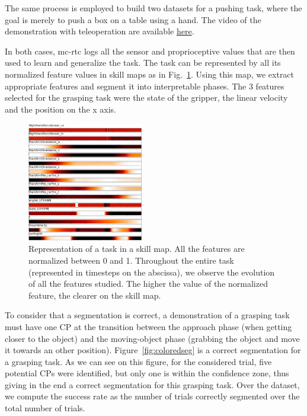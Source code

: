 \documentclass[conference]{IEEEtran}
\begin{document}
 The same process is employed to build two datasets for a pushing task, where the goal is merely to push a box on a table using a hand. The video of the demonstration with teleoperation are available \href{https://github.com/VictorBbt/Article_TaskGeneralization}{here}.

 In both cases, mc-rtc logs all the sensor and proprioceptive values that are then used to learn and generalize the task. The task can be represented by all its normalized feature values in skill maps as in Fig.~\ref{fig:skillmap}. Using this map, we extract appropriate features and segment it into interpretable phases. The 3 features selected for the grasping task were the state of the gripper, the linear velocity and the position on the x axis. %

 \begin{figure}[t]
  \centering
  \includegraphics[width=0.45\textwidth]{img/skillMap.pdf}
  \caption{Representation of a task in a skill map. All the features are normalized between 0 and 1. Throughout the entire task (represented in timesteps on the abscissa), we observe the evolution of all the features studied. The higher the value of the normalized feature, the clearer on the skill map.}
  \label{fig:skillmap}
\end{figure}

To consider that a segmentation is correct, a demonstration of a grasping task must have one CP at the transition between the approach phase (when getting closer to the object) and the moving-object phase (grabbing the object and move it towards an other position). 
Figure~\ref{fig:coloredseg} is a correct segmentation for a grasping task. As we can see on this figure, for the considered trial, five potential CPs were identified, but only one is within the confidence zone, thus giving in the end a correct segmentation for this grasping task. Over the dataset, we compute the success rate as the number of trials correctly segmented over the total number of trials.
\end{document}
